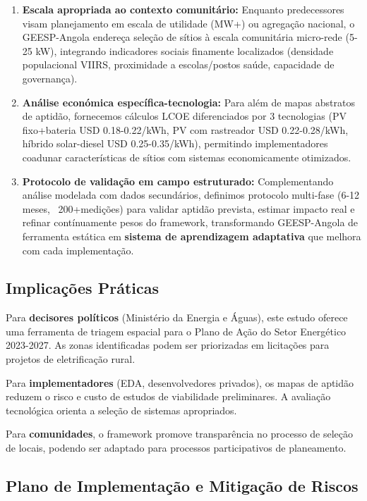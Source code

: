 \documentclass[12pt, a4paper]{article}
\begin{document}
\begin{enumerate}
    \item \textbf{Escala apropriada ao contexto comunitário:} Enquanto predecessores visam planejamento em escala de utilidade (MW+) ou agregação nacional, o GEESP-Angola endereça seleção de sítios à escala comunitária micro-rede (5-25 kW), integrando indicadores sociais finamente localizados (densidade populacional VIIRS, proximidade a escolas/postos saúde, capacidade de governança).
    
    \item \textbf{Análise económica específica-tecnologia:} Para além de mapas abstratos de aptidão, fornecemos cálculos LCOE diferenciados por 3 tecnologias (PV fixo+bateria USD 0.18-0.22/kWh, PV com rastreador USD 0.22-0.28/kWh, híbrido solar-diesel USD 0.25-0.35/kWh), permitindo implementadores coadunar características de sítios com sistemas economicamente otimizados.
    
    \item \textbf{Protocolo de validação em campo estruturado:} Complementando análise modelada com dados secundários, definimos protocolo multi-fase (6-12 meses, ~200+medições) para validar aptidão prevista, estimar impacto real e refinar contínuamente pesos do framework, transformando GEESP-Angola de ferramenta estática em \textbf{sistema de aprendizagem adaptativa} que melhora com cada implementação.
\end{enumerate}

\subsection{Implicações Práticas}

Para \textbf{decisores políticos} (Ministério da Energia e Águas), este estudo oferece uma ferramenta de triagem espacial para o Plano de Ação do Setor Energético 2023-2027. As zonas identificadas podem ser priorizadas em licitações para projetos de eletrificação rural.

Para \textbf{implementadores} (EDA, desenvolvedores privados), os mapas de aptidão reduzem o risco e custo de estudos de viabilidade preliminares. A avaliação tecnológica orienta a seleção de sistemas apropriados.

Para \textbf{comunidades}, o framework promove transparência no processo de seleção de locais, podendo ser adaptado para processos participativos de planeamento.

\subsection{Plano de Implementação e Mitigação de Riscos}
\end{document}
